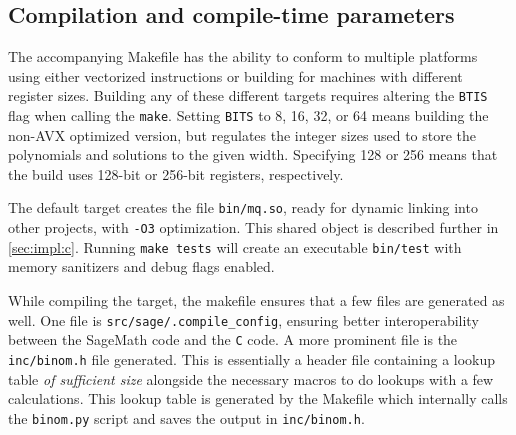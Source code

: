 \subsection{Compilation and compile-time parameters} \label{sec:impl:compile}
The accompanying Makefile has the ability to conform to multiple platforms using either vectorized instructions or building for machines with different register sizes. Building any of these different targets requires altering the \texttt{BTIS} flag when calling the \texttt{make}. Setting \texttt{BITS} to 8, 16, 32, or 64 means building the non-AVX optimized version, but regulates the integer sizes used to store the polynomials and solutions to the given width. Specifying 128 or 256 means that the build uses 128-bit or 256-bit registers, respectively. 

The default target creates the file \texttt{bin/mq.so}, ready for dynamic linking into other projects, with \texttt{-O3} optimization. This shared object is described further in \cref{sec:impl:c}. Running \texttt{make tests} will create an executable \texttt{bin/test} with memory sanitizers and debug flags enabled. 

While compiling the target, the makefile ensures that a few files are generated as well. One file is \texttt{src/sage/.compile\_config}, ensuring better interoperability between the SageMath code and the \texttt{C} code. A more prominent file is the \texttt{inc/binom.h} file generated. This is essentially a header file containing a lookup table \textit{of sufficient size} alongside the necessary macros to do lookups with a few calculations. This lookup table is generated by the Makefile which internally calls the \texttt{binom.py} script and saves the output in \texttt{inc/binom.h}.

\newpage